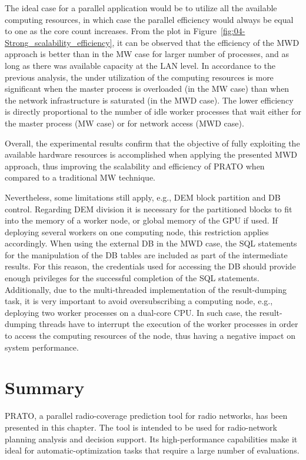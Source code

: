 The ideal case for a parallel application would be to utilize all
the available computing resources, in which case the parallel efficiency
would always be equal to one as the core count increases. From the
plot in Figure~\ref{fig:04-Strong_scalability_efficiency}, it can
be observed that the efficiency of the MWD approach is better than
in the MW case for larger number of processes, and as long as there
was available capacity at the LAN level. In accordance to the previous
analysis, the under utilization of the computing resources is more
significant when the master process is overloaded (in the MW case)
than when the network infrastructure is saturated (in the MWD case).
The lower efficiency is directly proportional to the number of idle
worker processes that wait either for the master process (MW case)
or for network access (MWD case).

Overall, the experimental results confirm that the objective of fully
exploiting the available hardware resources is accomplished when applying
the presented MWD approach, thus improving the scalability and efficiency
of PRATO when compared to a traditional MW technique.

Nevertheless, some limitations still apply, e.g., DEM block partition
and DB control. Regarding DEM division it is necessary for the partitioned
blocks to fit into the memory of a worker node, or global memory of
the GPU if used. If deploying several workers on one computing node,
this restriction applies accordingly. When using the external DB in
the MWD case, the SQL statements for the manipulation of the DB tables
are included as part of the intermediate results. For this reason,
the credentials used for accessing the DB should provide enough privileges
for the successful completion of the SQL statements. Additionally,
due to the multi-threaded implementation of the result-dumping task,
it is very important to avoid oversubscribing a computing node, e.g.,
deploying two worker processes on a dual-core CPU. In such case, the
result-dumping threads have to interrupt the execution of the worker
processes in order to access the computing resources of the node,
thus having a negative impact on system performance.




\section{Summary \label{sec:04-Summary}}

PRATO, a parallel radio-coverage prediction tool for radio networks,
has been presented in this chapter. The tool is intended to be used
for radio-network planning analysis and decision support. Its high-performance
capabilities make it ideal for automatic-optimization tasks that require
a large number of evaluations.

